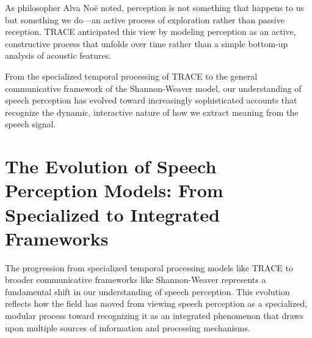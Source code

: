 \documentclass[12pt,a4paper]{article}
\begin{document}
\begin{tcolorbox}[enhanced, colback=purple!5, colframe=purple!75!black, title=TRACE's Influence on Contemporary Theories]
\begin{center}
\end{center}
\end{tcolorbox}

As philosopher Alva Noë noted, perception is not something that happens to us but something we do—an active process of exploration rather than passive reception. TRACE anticipated this view by modeling perception as an active, constructive process that unfolds over time rather than a simple bottom-up analysis of acoustic features.

From the specialized temporal processing of TRACE to the general communicative framework of the Shannon-Weaver model, our understanding of speech perception has evolved toward increasingly sophisticated accounts that recognize the dynamic, interactive nature of how we extract meaning from the speech signal.

\section{The Evolution of Speech Perception Models: From Specialized to Integrated Frameworks}

The progression from specialized temporal processing models like TRACE to broader communicative frameworks like Shannon-Weaver represents a fundamental shift in our understanding of speech perception. This evolution reflects how the field has moved from viewing speech perception as a specialized, modular process toward recognizing it as an integrated phenomenon that draws upon multiple sources of information and processing mechanisms.
\end{document}
